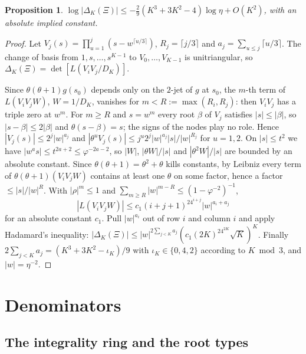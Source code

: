 \documentclass[11pt]{amsart}
\newtheorem{proposition}[theorem]{Proposition}
\theoremstyle{definition}
\theoremstyle{remark}
\numberwithin{equation}{section}
\begin{document}
\begin{proposition}\label{prop:decay}
$\log|\Delta_K(\Xi)|\le-\tfrac29(K^3+3K^2-4)\log\eta+O(K^2)$, with an absolute implied constant.
\end{proposition}
\begin{proof}
Let $V_j(s)=\prod_{u=1}^j(s-w^{\lceil u/3\rceil})$, $R_j=\lceil j/3\rceil$ and $a_j=\sum_{u\le j}\lceil u/3\rceil$.
The change of basis from $1,s,\dots,s^{K-1}$ to $V_0,\dots,V_{K-1}$ is unitriangular, so
$\Delta_K(\Xi)=\det[L(V_iV_j/D_K)]$.

Since $\theta(\theta+1)g(s_0)$ depends only on the $2$-jet of $g$ at $s_0$, the $m$-th term of $L(V_iV_jW)$,
$W=1/D_K$, vanishes for $m<R:=\max(R_i,R_j)$: then $V_iV_j$ has a triple zero at $w^m$. For $m\ge R$ and $s=w^m$ every
root $\beta$ of $V_j$ satisfies $|s|\le|\beta|$, so $|s-\beta|\le2|\beta|$ and $\theta(s-\beta)=s$; the signs of the
nodes play no role. Hence $|V_j(s)|\le2^j|w|^{a_j}$ and $|\theta^uV_j(s)|\le j^u2^j|w|^{a_j}|s|/|w|^{R_j}$ for $u=1,2$.
On $|s|\le t^2$ we have $|w^as|\le t^{2a+2}\le\varphi^{-2a-2}$, so $|W|$, $|\theta W|/|s|$ and $|\theta^2W|/|s|$ are
bounded by an absolute constant. Since $\theta(\theta+1)=\theta^2+\theta$ kills constants, by Leibniz every term of
$\theta(\theta+1)(V_iV_jW)$ contains at least one $\theta$ on some factor, hence a factor $\le|s|/|w|^R$. With
$|\rho|^m\le1$ and $\sum_{m\ge R}|w|^{m-R}\le(1-\varphi^{-2})^{-1}$,
\[
|L(V_iV_jW)|\le c_1(i+j+1)^24^{i+j}|w|^{a_i+a_j}
\]
for an absolute constant $c_1$. Pull $|w|^{a_i}$ out of row $i$ and column $i$ and apply Hadamard's inequality:
$|\Delta_K(\Xi)|\le|w|^{2\sum_{j<K}a_j}(c_1(2K)^24^{2K}\sqrt K)^K$. Finally
$2\sum_{j<K}a_j=(K^3+3K^2-\iota_K)/9$ with $\iota_K\in\{0,4,2\}$ according to $K\bmod3$, and $|w|=\eta^{-2}$.
\end{proof}

\section{Denominators}\label{sec:den}

\subsection{The integrality ring and the root types}
\end{document}
